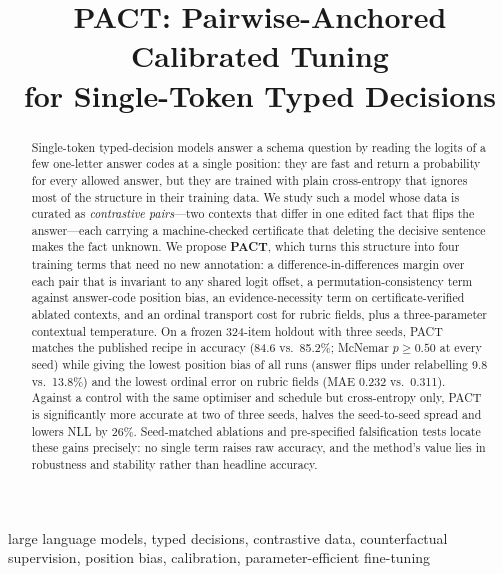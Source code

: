 \documentclass[conference]{IEEEtran}
\begin{document}
\title{PACT: Pairwise-Anchored Calibrated Tuning\\
for Single-Token Typed Decisions}

\author{
}

\maketitle

\begin{abstract}
Single-token typed-decision models answer a schema question by reading the
logits of a few one-letter answer codes at a single position: they are fast
and return a probability for every allowed answer, but they are trained with
plain cross-entropy that ignores most of the structure in their training data.
We study such a model whose data is curated as \emph{contrastive pairs}---two
contexts that differ in one edited fact that flips the answer---each carrying a
machine-checked certificate that deleting the decisive sentence makes the fact
unknown. We propose \textbf{PACT}, which turns this structure into four
training terms that need no new annotation: a difference-in-differences margin
over each pair that is invariant to any shared logit offset, a
permutation-consistency term against answer-code position bias, an
evidence-necessity term on certificate-verified ablated contexts, and an
ordinal transport cost for rubric fields, plus a three-parameter contextual
temperature. On a frozen 324-item holdout with three seeds, PACT matches the
published recipe in accuracy (84.6 vs.\ 85.2\%; McNemar $p\ge0.50$ at every
seed) while giving the lowest position bias of all runs (answer flips under
relabelling 9.8 vs.\ 13.8\%) and the lowest ordinal error on rubric fields
(MAE 0.232 vs.\ 0.311). Against a control with the same optimiser and schedule
but cross-entropy only, PACT is significantly more accurate at two of three
seeds, halves the seed-to-seed spread and lowers NLL by 26\%. Seed-matched
ablations and pre-specified falsification tests locate these gains precisely:
no single term raises raw accuracy, and the method's value lies in robustness
and stability rather than headline accuracy.
\end{abstract}

\begin{IEEEkeywords}
large language models, typed decisions, contrastive data, counterfactual
supervision, position bias, calibration, parameter-efficient fine-tuning
\end{IEEEkeywords}
\end{document}
